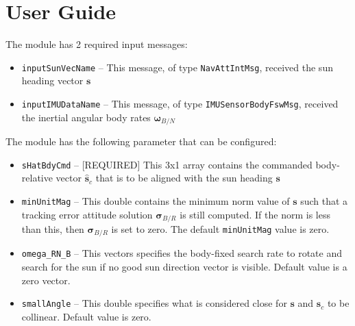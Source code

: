 
\section{User Guide}
The module has 2 required input messages:
\begin{itemize}
	\item {\tt inputSunVecName} -- This message, of type {\tt NavAttIntMsg}, received the sun heading vector $\bm s$
	\item {\tt inputIMUDataName} -- This message, of type {\tt IMUSensorBodyFswMsg}, received the inertial angular body rates $\bm \omega_{B/N}$
\end{itemize}

The module has the following parameter that can be configured:
\begin{itemize}
	\item {\tt sHatBdyCmd} -- [REQUIRED] This 3x1 array contains the commanded body-relative vector $\hat{\bm s}_{c}$ that is to be aligned with the sun heading $\bm s$
	
	\item {\tt minUnitMag} -- This double contains the minimum norm value of $\bm s$ such that a tracking error attitude solution $\bm\sigma_{B/R}$ is still computed.  If the norm is less than this, then $\bm\sigma_{B/R}$ is set to zero.    The default {\tt minUnitMag} value is zero. 
	
	\item {\tt omega\_RN\_B} -- This vectors specifies the body-fixed search rate to rotate and search for the sun if no good sun direction vector is visible.  Default value is a zero vector.  

	\item {\tt smallAngle} -- This double specifies what is considered close for $\bm s$ and $\hat{\bm s}_{c}$ to be collinear.  Default value is zero.  
	
\end{itemize}

